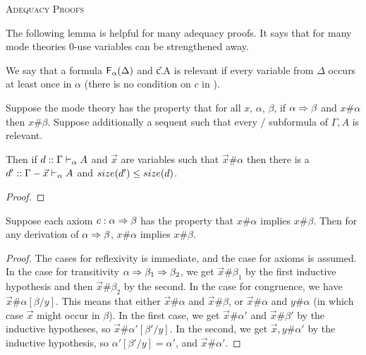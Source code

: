
\begin{center}
 \textsc{Adequacy Proofs}
\end{center}
\label{sec:adequacy-long}

The following lemma is helpful for many adequacy proofs.  It says that
for many mode theories 0-use variables can be strengthened away.  

\begin{lemma} \label{lem:0-use-strengthening}
We say that a formula $\mathsf{F}_{\alpha}(\Delta)$ and \U{c.\alpha}{\Delta}{A}
is relevant if every variable from $\Delta$ occurs at least once in
$\alpha$ (there is no condition on $c$ in \Usymb).

Suppose the mode theory has the property that for all $x$, $\alpha$,
$\beta$, if $\alpha \Rightarrow \beta$ and $x \# \alpha$ then $x \# \beta$.
Suppose additionally a sequent  such that every
\Fsymb/\Usymb\/ subformula of $\Gamma,A$ is relevant.

Then if $d :: \Gamma \vdash_{\alpha} A$ and $\vec{x}$ are variables such
that $\vec{x} \# \alpha$ then there is a $d' ::
\Gamma-\vec{x} \vdash_{\alpha} A$ and $size(d') \le size(d)$.
\end{lemma}

\begin{proof}
\end{proof}

\begin{lemma} \label{lem:spr-doesnt-introduce}
Suppose each axiom $c : \alpha \Rightarrow \beta$ has the property that $x \#
\alpha$ implies $x \# \beta$.  Then for any derivation of $\alpha \Rightarrow
\beta$, $x \# \alpha$ implies $x \# \beta$.
\end{lemma}

\begin{proof}
The cases for reflexivity is immediate, and the case for axioms is
assumed.  In the case for transitivity $\alpha \Rightarrow \beta_1 \Rightarrow
\beta_2$, we get $\vec{x} \# \beta_1$ by the first inductive hypothesis
and then $\vec{x} \# \beta_2$ by the second.  In the case for
congruence, we have $\vec{x} \# \alpha[\beta/y]$.  This means that
either $\vec{x} \# \alpha$ and $\vec{x} \# \beta$, or $\vec{x} \#
\alpha$ and $y \# \alpha$ (in which case $\vec{x}$ might occur in
$\beta$).  In the first case, we get $\vec{x} \# \alpha'$ and $\vec{x}
\# \beta'$ by the inductive hypotheses, so $\vec{x} \#
\alpha'[\beta'/y]$.  In the second, we get $\vec{x},y \# \alpha'$ by the
inductive hypothesis, so $\alpha'[\beta'/y] = \alpha'$, and $\vec{x} \#
\alpha'$.
\end{proof}

